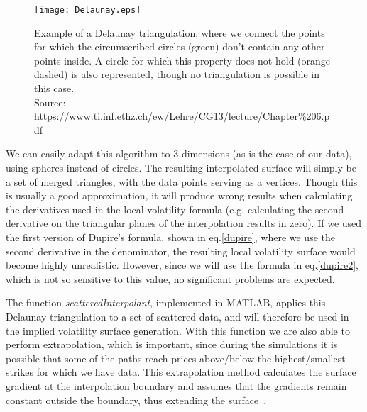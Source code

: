 \begin{figure}[!htb]
    \centering
      \texttt{[image: Delaunay.eps]}
      \caption[Example of a Delaunay triangulation, where we connect the points for which the circumscribed circles don't contain any other points inside. A circle for which this property does not hold is also represented, though no triangulation is possible in this case.]{Example of a Delaunay triangulation, where we connect the points for which the circumscribed circles (green) don't contain any other points inside. A circle for which this property does not hold (orange dashed) is also represented, though no triangulation is possible in this case.\\{\small Source: \url{https://www.ti.inf.ethz.ch/ew/Lehre/CG13/lecture/Chapter\%206.pdf}}}\label{fig:Delaunay}
    \end{figure}

We can easily adapt this algorithm to 3-dimensions (as is the case of our data), using spheres instead of circles.
The resulting interpolated surface will simply be a set of merged triangles, with the data points serving as a vertices. Though this is usually a good approximation, it will produce wrong results when calculating the derivatives used in the local volatility formula (e.g. calculating the second derivative on the triangular planes of the interpolation results in zero). If we used the first version of Dupire's formula, shown in eq.\eqref{dupire}, where we use the second derivative in the denominator, the resulting local volatility surface would become highly unrealistic. However, since we will use the formula in eq.\eqref{dupire2}, which is not so sensitive to this value, no significant problems are expected.

The function \emph{scatteredInterpolant}, implemented in MATLAB, applies this Delaunay triangulation to a set of scattered data, and will therefore be used in the implied volatility surface generation. With this function we are also able to perform extrapolation, which is important, since during the simulations it is possible that some of the paths reach prices above/below the highest/smallest strikes for which we have data. This extrapolation method calculates the surface gradient at the interpolation boundary and assumes that the gradients remain constant outside the boundary, thus extending the surface~\citep{MATLABextrap}.


